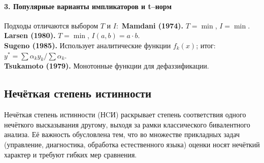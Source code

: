 \paragraph{3. Популярные варианты импликаторов и t–норм}
Подходы отличаются выбором $T$ и $I$:\
\textbf{Mamdani (1974).} $T=\min$, $I=\min$.\\
\textbf{Larsen (1980).} $T=\min$, $I(a,b)=a\cdot b$.\\
\textbf{Sugeno (1985).} Использует аналитические функции $f_k(x)$; итог:
$y^*=\sum\alpha_k y_k/\sum\alpha_k$.\\
\textbf{Tsukamoto (1979).} Монотонные функции для дефаззификации.

%

\subsection{Нечёткая степень истинности}

Нечёткая степень истинности (НCИ) раскрывает степень соответствия одного нечёткого высказывания другому, выходя за рамки классического бивалентного анализа. Её важность обусловлена тем, что во множестве прикладных задач (управление, диагностика, обработка естественного языка) оценки носят нечёткий характер и требуют гибких мер сравнения.


